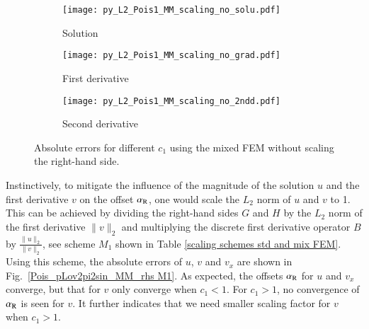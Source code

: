 \documentclass[review,3p]{elsarticle}
\begin{document}
\begin{figure}[!ht]
    \begin{subfigure}{5.5cm}
        \texttt{[image: py\_L2\_Pois1\_MM\_scaling\_no\_solu.pdf]}
        \caption{Solution}
        \label{py_L2_Pois1_MM_scaling_no_solu}
    \end{subfigure}
    \hspace{-0.2cm}
    \begin{subfigure}{5.5cm}
        \texttt{[image: py\_L2\_Pois1\_MM\_scaling\_no\_grad.pdf]}
        \caption{First derivative}
        \label{py_L2_Pois1_MM_scaling_no_grad}
    \end{subfigure}
    \hspace{-0.2cm}
    \begin{subfigure}{5.5cm}
        \texttt{[image: py\_L2\_Pois1\_MM\_scaling\_no\_2ndd.pdf]}
        \caption{Second derivative}
        \label{py_L2_Pois1_MM_scaling_no_2ndd}
    \end{subfigure}
\caption{Absolute errors for different $c_1$ using the mixed FEM without scaling the right-hand side.}    
\label{Pois_pLov2pi2sin_MM_rhs orig}
\end{figure}

Instinctively, to mitigate the influence of the magnitude of the solution $u$ and the first derivative $v$ on the offset $\alpha_{\rm R}$, one would scale the $L_2$ norm of $u$ and $v$ to 1. This can be achieved by dividing the right-hand sides $G$ and $H$ by the $L_2$ norm of the first derivative $\|v\|_{2}$ and multiplying the discrete first derivative operator $B$ by $\frac{\|u\|_{2}}{\|v\|_{2}}$, see scheme $M_1$ shown in Table \ref{scaling schemes std and mix FEM}.
Using this scheme, the absolute errors of $u$, $v$ and $v_{x}$ are shown in Fig.~\ref{Pois_pLov2pi2sin_MM_rhs M1}.
As expected, the offsets $\alpha_{\rm R}$ for $u$ and $v_{x}$ converge, but that for $v$ only converge when $c_1<1$.
For $c_1>1$, no convergence of $\alpha_{\rm R}$ is seen for $v$. It further indicates that we need smaller scaling factor for $v$ when $c_1>1$.
\end{document}
